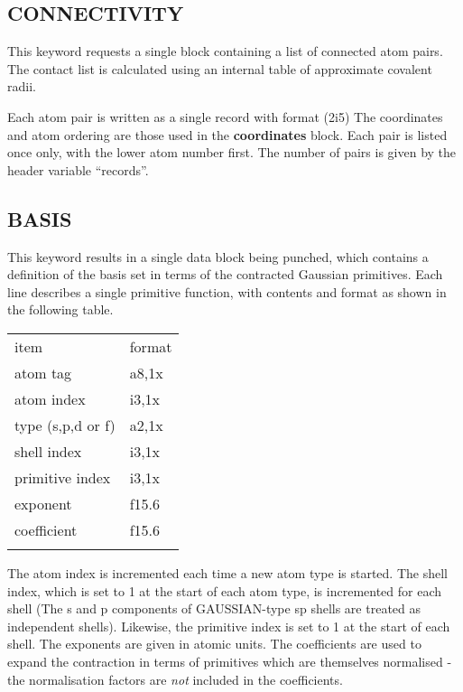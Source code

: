 \documentclass[11pt,fleqn]{article}
\begin{document}
\subsection[CONNECTIVITY]{CONNECTIVITY}

This keyword requests a single block containing a list
of connected atom pairs. The contact list is calculated using an 
internal table of approximate covalent radii.

Each atom pair is written as a single record with format (2i5)
The coordinates and atom ordering are those used in the 
{\bf coordinates} block. Each pair is listed once only, with the
lower atom number first. The number of pairs is given by the header
variable ``records''.

\subsection[BASIS]{BASIS}
This keyword results in a single data block being punched, which 
contains a definition of the basis set in terms of the contracted
Gaussian primitives. Each line describes a single primitive function, 
with contents and format as shown in the following table.

 \begin{centering}
 \begin{tabular}{ll}
\\ \hline
  item         & format\\ \cline{1-2}
atom tag   &  a8,1x \\
atom index   & i3,1x \\
type (s,p,d or f)  &      a2,1x  \\
shell index    &  i3,1x \\
primitive index  & i3,1x \\
exponent      &  f15.6 \\
coefficient   &  f15.6 \\
\hline
\\
 \end{tabular}

 \end{centering}
The atom index is incremented each time a new atom type is started. 
The shell index, which is set to 1 at the start of each atom type,
is incremented for each shell (The s and p components of
GAUSSIAN-type sp shells are treated as independent shells). Likewise, 
the primitive index is set to 1 at the start of each shell. The exponents
are given in atomic units. The coefficients are used to expand the contraction
in terms of primitives which are themselves normalised - the normalisation factors
are {\em not} included in the coefficients. 
\end{document}
